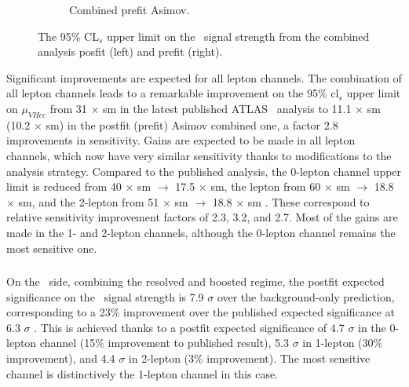 \begin{figure}[h!]
\begin{subfigure}[b]{0.48\textwidth}
      \caption{Combined prefit Asimov.}
      \label{fig:fit_new_vhcclimitPrefit}
  \end{subfigure}
    \caption{The 95\% CL$_s$ upper limit on the \vhc\ signal strength from the combined analysis posfit (left) and prefit (right).}
    \label{fig:fit_vhcc_limits}
\end{figure} 

Significant improvements are expected for all lepton channels. The combination of all lepton channels leads to a remarkable improvement on the 95\% \gls{cl}$_s$ upper limit on $\mu_{VHcc}$ from 31 $\times$ \gls{sm} in the latest published ATLAS \vhc\ analysis \cite{Collaboration:2721696} to 11.1 $\times$ \gls{sm} (10.2 $\times$ \gls{sm}) in the postfit (prefit) Asimov combined one, a factor 2.8 improvements in sensitivity. Gains are expected to be made in all lepton channels, which now have very similar sensitivity thanks to modifications to the analysis strategy. Compared to the published analysis, the 0-lepton channel upper limit is reduced from 40 $\times$ \gls{sm} $\rightarrow$ 17.5 $\times$ \gls{sm}, the lepton from 60 $\times$ \gls{sm} $\rightarrow$ 18.8 $\times$ \gls{sm}, and the 2-lepton from 51 $\times$ \gls{sm} $\rightarrow$ 18.8 $\times$ \gls{sm} \cite{Collaboration:2721696}. These correspond to relative sensitivity improvement factors of 2.3, 3.2, and 2.7. Most of the gains are made in the 1- and 2-lepton channels, although the 0-lepton channel remains the most sensitive one.

\subsubsection{\boldvhb}
On the \vhb\ side, combining the resolved and boosted regime, the postfit expected significance on the \vhb\ signal strength is 7.9 $\sigma$ over the background-only prediction, corresponding to a 23\% improvement over the published expected significance at 6.3 $\sigma$ \cite{ATLAS:2021wqh}. This is achieved thanks to a postfit expected significance of 4.7 $\sigma$ in the 0-lepton channel (15\% improvement to published result), 5.3 $\sigma$ in 1-lepton (30\% improvement), and 4.4 $\sigma$ in 2-lepton (3\% improvement). The most sensitive channel is distinctively the 1-lepton channel in this case. \\%

